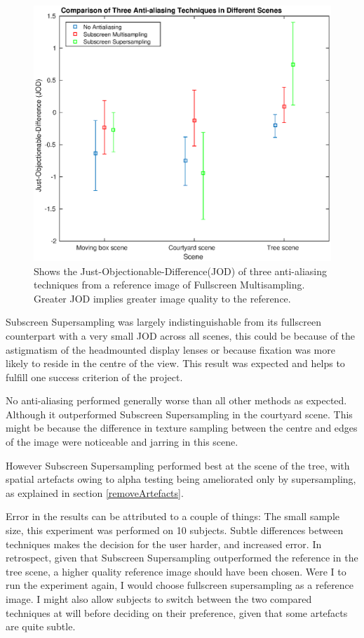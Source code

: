 \documentclass[12pt,a4paper,twoside,openright]{report}
\begin{document}
\begin{figure}[tbh]
\centerline{\includegraphics[width=14cm]{figs/jod.eps}}
\caption{Shows the Just-Objectionable-Difference(JOD) of three anti-aliasing techniques from a reference image of Fullscreen Multisampling. Greater JOD implies greater image quality to the reference.}
\label{fig:jod}
\end{figure}

\noindent Subscreen Supersampling was largely indistinguishable from its fullscreen counterpart with a very small JOD across all scenes, this could be because of the astigmatism of the headmounted display lenses or because fixation was more likely to reside in the centre of the view. This result was expected and helps to fulfill one success criterion of the project. 

No anti-aliasing performed generally worse than all other methods as expected. Although it outperformed Subscreen Supersampling in the courtyard scene. This might be because the difference in texture sampling between the centre and edges of the image were noticeable and jarring in this scene.

However Subscreen Supersampling performed best at the scene of the tree, with spatial artefacts owing to alpha testing being ameliorated only by supersampling, as explained in section \ref{removeArtefacts}.

Error in the results can be attributed to a couple of things: The small sample size, this experiment was performed on 10 subjects. Subtle differences between techniques makes the decision for the user harder, and increased error. 
In retrospect, given that Subscreen Supersampling outperformed the reference in the tree scene, a higher quality reference image should have been chosen. Were I to run the experiment again, I would choose fullscreen supersampling as a reference image. I might also allow subjects to switch between the two compared techniques at will before deciding on their preference, given that some artefacts are quite subtle.
\end{document}
